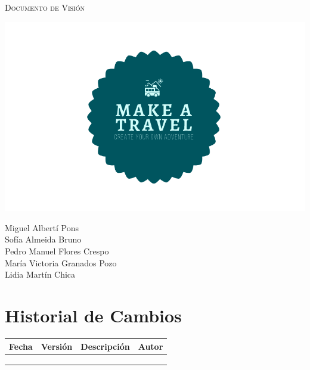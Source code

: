 \documentclass[11pt]{article}
\begin{document}
\begin{titlepage}
\centering
\vspace{4.5cm}
{\scshape\LARGE Documento de Visión \par}
\vspace{1.5cm}

\includegraphics[width=16cm]{Logo}

\vspace{3cm}
{\scshape\large \par}
\vspace{1cm}

{Miguel Albertí Pons\\
Sofía Almeida Bruno\\
Pedro Manuel Flores Crespo\\
María Victoria Granados Pozo\\
Lidia Martín Chica
\par}

\end{titlepage}

\section{Historial de Cambios}
\begin{table}[H]
	\centering
	\begin{tabular*}{0.75\textwidth}{c c c c}
		\textbf{Fecha} & \textbf{Versión} & \textbf{Descripción} & \textbf{Autor} \\ \hline
		&  &  &  \\ \hline
		&  &  &  \\ \hline
		&  &  &  \\ \hline
	\end{tabular*}
\end{table}
\end{document}
